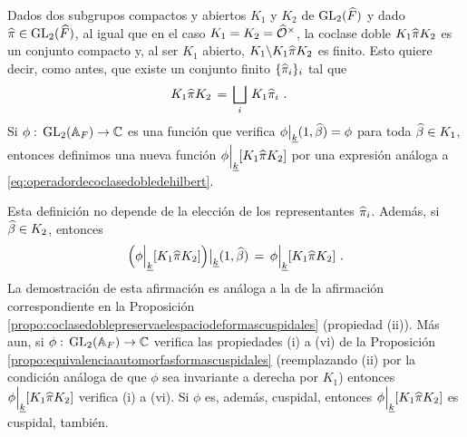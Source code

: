 Dados dos subgrupos compactos y abiertos $K_{1}$ y $K_{2}$ de
$\mathrm{GL}_{2}(\widehat{F})$ y dado $\widehat{\pi}\in\mathrm{GL}_{2}(\widehat{F})$, al igual que en
el caso $K_{1}=K_{2}=\widehat{\mathcal{O}}^{\times}$, la coclase doble $K_{1}\widehat{\pi}K_{2}$
es un conjunto compacto y, al ser $K_{1}$ abierto,
$K_{1}\backslash K_{1}\widehat{\pi}K_{2}$ es finito. Esto quiere decir, como
antes, que existe un conjunto finito $\{\widehat{\pi}_{i}\}_{i}$ tal que
\begin{align*}
	K_{1}\widehat{\pi}K_{2} & \,=\,\bigsqcup_{i}\,K_{1}\widehat{\pi}_{i}
	\text{ .}
\end{align*}
%
Si $\phi:\,\mathrm{GL}_{2}(\mathbb{A}_{F})\rightarrow\mathbb{C}$ es una funci\'{o}n
que verifica $\phi\big|_{\underline{k}}{(1,\widehat{\beta})}=\phi$ para
toda $\widehat{\beta}\in K_{1}$, entonces definimos una nueva funci\'{o}n
\begin{math}
	\phi\Big|_{\underline{k}}{[K_{1}\widehat{\pi}K_{2}]}
\end{math}
por una expresi\'{o}n an\'{a}loga a \eqref{eq:operadordecoclasedobledehilbert}.

\begin{obsDefinicionOperadorDeCoclaseDoble}%
	\label{obs:definicionoperadordecoclasedoble}
	Esta definici\'{o}n no depende de la elecci\'{o}n de los representantes
	$\widehat{\pi}_{i}$. Adem\'{a}s, si $\widehat{\beta}\in K_{2}$, entonces
	\begin{equation}
		\label{eq:invarianzaaderechaluegodecolcasedoblematrices}
		\Big(\phi\Big|_{\underline{k}}{[K_{1}\widehat{\pi}K_{2}]}
			\Big)\big|_{\underline{k}}{(1,\widehat{\beta})}
		\,=\,\phi\Big|_{\underline{k}}{[K_{1}\widehat{\pi}K_{2}]}
		\text{ .}
	\end{equation}
	La demostraci\'{o}n de esta afirmaci\'{o}n es an\'{a}loga a la de la
	afirmaci\'{o}n correspondiente en la Proposici\'{o}n~%
	\ref{propo:coclasedoblepreservaelespaciodeformascuspidales} (propiedad
	(ii)). M\'{a}s aun, si $\phi:\,\mathrm{GL}_{2}(\mathbb{A}_{F})\rightarrow\mathbb{C}$
	verifica las propiedades (i) a (vi) de la Proposici\'{o}n~%
	\ref{propo:equivalenciaautomorfasformascuspidales} (reemplazando (ii)
	por la condici\'{o}n an\'{a}loga de que $\phi$ sea invariante a derecha
	por $K_{1}$) entonces
	$\phi\Big|_{\underline{k}}{[K_{1}\widehat{\pi}K_{2}]}$ verifica (i) a
	(vi). Si $\phi$ es, adem\'{a}s, cuspidal, entonces
	$\phi\Big|_{\underline{k}}{[K_{1}\widehat{\pi}K_{2}]}$ es cuspidal,
	tambi\'{e}n.
\end{obsDefinicionOperadorDeCoclaseDoble}


